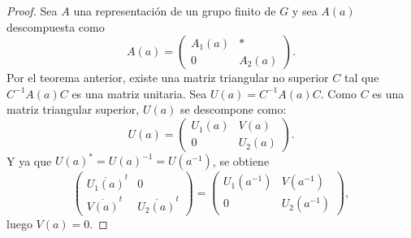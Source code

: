 \documentclass[12pt]{book}
\theoremstyle{definition}
\newcounter{in}
\newcounter{ini}
\begin{document}
\begin{proof}
  Sea $A$ una representación de un grupo finito de $G$ y sea $A(a)$
  descompuesta como
  \begin{equation}
    \label{eq:13}
        A(a)=
    \begin{pmatrix}
      A_{1}(a) & * \\ 
      0 & A_{2}(a)
    \end{pmatrix}.
  \end{equation}
  Por el teorema anterior, existe una matriz triangular no superior
  $C$ tal que $C^{-1}A(a)C$ es una matriz unitaria. Sea
  $U(a)=C^{-1}A(a)C$. Como $C$ es una matriz triangular superior,
  $U(a)$ se descompone como:
  \begin{equation}
    \label{eq:14}
    U(a)=
    \begin{pmatrix}
      U_{1}(a) & V(a) \\ 
      0 & U_{2}(a)
    \end{pmatrix}.
  \end{equation}  
  Y ya que $U(a)^{*}=U(a)^{-1}=U(a^{-1})$, se obtiene
  \begin{equation}
    \label{eq:15}
    \begin{pmatrix}
      \overline{U_{1}(a)}^{t} & 0 \\ 
      \overline{V(a)}^{t} & \overline{U_{2}(a)}^{t}
    \end{pmatrix}
    =
    \begin{pmatrix}
      U_{1}(a^{-1}) & V(a^{-1}) \\ 
      0 & U_{2}(a^{-1})
    \end{pmatrix},
  \end{equation}
  luego $V(a)=0$.
\end{proof}
\end{document}
